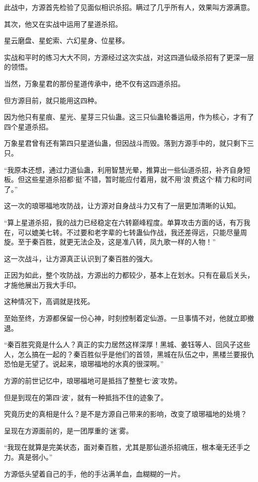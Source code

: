 \begin{this_body}
此战中，方源首先检验了见面似相识杀招。瞒过了几乎所有人，效果叫方源满意。

其次，他又在实战中运用了星道杀招。

星云磨盘、星蛇索、六幻星身、位星移。

实战和平时的练习大大不同，方源经过这次实战，对这四道仙级杀招有了更深一层的领悟。

当然，万象星君的那份星道传承中，绝不仅有这四道杀招。

但方源目前，就只能用这四种。

因为他只有星痕、星光、星芽三只仙蛊。这三只仙蛊轮番运用，作为核心，才有了四个星道杀招。

万象星君曾有还有第四只星道仙蛊，但因战斗而毁。落到方源手中的，就只剩下三只。

“我原本还想，通过力道仙蛊，利用智慧光晕，推算出一些仙道杀招，补齐自身短板。但这些星道杀招都‘挺’不错，暂时能应付着用，就不用‘浪’费这个‘精’力和时间了。”

这一次的琅琊福地攻防战，让方源对自身战斗力又有了一层更加清晰的认知。

“算上星道杀招，我的战力已经稳定在六转巅峰程度。单算攻击方面的话，有万我在，可以媲美七转。不过要和老字辈的七转蛊仙作战，我还差得远，只能尽量周旋。至于秦百胜，就更无法企及，这是准八转，凤九歌一样的人物！”

这一次战斗，让方源真正认识到了秦百胜的强大。

正因为如此，整个攻防战，方源出的力都较少，基本上在划水。只有在最后关头，才施他展出万我大手印。

这种情况下，高调就是找死。

至始至终，方源都保留一份心神，时刻控制着定仙游。一旦事情不对，他就立即撤退。

“秦百胜究竟是什么人？真正的实力居然这样深厚！黑城、姜钰等人、回风子这些人，怎么搞在一起的？秦百胜似乎是他们的首领，黑城在队伍之中，黑楼兰要报仇恐怕是无望了。说起来，琅琊福地的水真的很深啊。”

方源的前世记忆中，琅琊福地可是抵挡了整整七‘波’攻势。

但是到现在的第四‘波’，就有一种抵挡不住的迹象了。

究竟历史的真相是什么？是不是方源自己带来的影响，改变了琅琊福地的处境？

呈现在方源面前的，是一团厚重的‘迷’雾。

“我现在就算是完美状态，面对秦百胜，尤其是那仙道杀招魂压，根本毫无还手之力。真是弱小。”

方源低头望着自己的手，他的手沾满羊血，血糊糊的一片。


\end{this_body}
